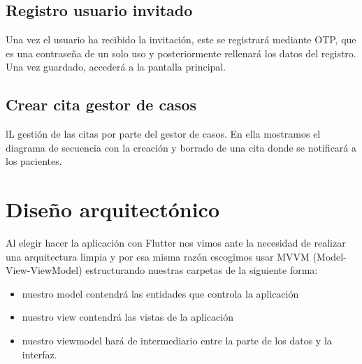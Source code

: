
\subsection{Registro usuario invitado}
Una vez el usuario ha recibido la invitación, este se registrará mediante OTP, que es una contraseña de un solo uso y posteriormente rellenará los datos del registro. Una vez guardado, accederá a la pantalla principal.


\subsection{Crear cita gestor de casos}
lL gestión de las citas por parte del gestor de casos. En ella mostramos el diagrama de secuencia con la creación y borrado de una cita donde se notificará a los pacientes.

\section{Diseño arquitectónico}
Al elegir hacer la aplicación con Flutter nos vimos ante la necesidad de realizar una arquitectura limpia y por esa misma razón escogimos usar MVVM (Model-View-ViewModel) estructurando nuestras carpetas de la siguiente forma:
\begin{itemize}
	\item nuestro model contendrá las entidades que controla la aplicación
	\item nuestro view contendrá las vistas de la aplicación
	\item nuestro viewmodel hará de intermediario entre la parte de los datos y la interfaz.
\end{itemize}



